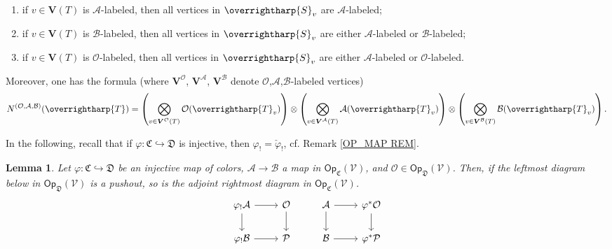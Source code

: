 \documentclass[a4paper,10pt
]{article}%
\numberwithin{equation}{section}
\numberwithin{figure}{section}
\newtheorem{lemma}[equation]{Lemma}%
\theoremstyle{definition} %
\newcommand{\vect}[1]{\text{\overrightharp{\ensuremath{#1}}}}
\newcommand{\V}{\ensuremath{\mathcal V}}
\newcommand{\1}{\ensuremath{\mathbbm 1}}%
\begin{document}
\begin{enumerate}[label=(\roman*)]
	\item if $v \in \boldsymbol{V}(T)$ is $\mathcal{A}$-labeled,
	then all vertices in $\vect{S}_{v}$ are $\mathcal{A}$-labeled;
	\item if $v \in \boldsymbol{V}(T)$ is $\mathcal{B}$-labeled,
	then all vertices in $\vect{S}_{v}$ are either $\mathcal{A}$-labeled or $\mathcal{B}$-labeled;
	\item if $v \in \boldsymbol{V}(T)$ is $\mathcal{O}$-labeled, then all vertices in $\vect{S}_{v}$ are either $\mathcal{A}$-labeled or $\mathcal{O}$-labeled.
\end{enumerate}
Moreover, one has the formula
(where $\boldsymbol{V}^{\mathcal{O}}$,
$\boldsymbol{V}^{\mathcal{A}}$,
$\boldsymbol{V}^{\mathcal{B}}$
denote
$\mathcal{O}$,$\mathcal{A}$,$\mathcal{B}$-labeled vertices)
\begin{equation}\label{NBAO EQ}
N^{(\mathcal{O},\mathcal{A},\mathcal{B})}(\vect{T}) = 
\left(\bigotimes_{v \in \boldsymbol{V}^{\mathcal{O}}(T)} \mathcal{O}(\vect{T}_v) \right)
\otimes
\left(\bigotimes_{v \in \boldsymbol{V}^{\mathcal{A}}(T)} \mathcal{A}(\vect{T}_v) \right)
\otimes
\left(\bigotimes_{v \in \boldsymbol{V}^{\mathcal{B}}(T)} \mathcal{B}(\vect{T}_v) \right).
\end{equation}


In the following, recall that if 
$\varphi \colon \mathfrak{C} \hookrightarrow \mathfrak{D}$
is injective, then
$\varphi_! = \check{\varphi}_!$,
cf. Remark \ref{OP_MAP REM}.



\begin{lemma}\label{BASICPUSH LEMMA}
	Let $\varphi \colon \mathfrak{C} \hookrightarrow \mathfrak{D}$ be an injective map of colors, 
	$\mathcal{A} \to \mathcal{B}$ a map in 
	$\mathsf{Op}_{\mathfrak{C}}(\V)$,
	and
	$\mathcal{O} \in \mathsf{Op}_{\mathfrak{D}}(\V)$.
	Then, if the leftmost diagram below in 
	$\mathsf{Op}_{\mathfrak{D}}(\V)$ is a pushout,
	so is the adjoint rightmost diagram in $\mathsf{Op}_{\mathfrak{C}}(\V)$.
	\[
	\begin{tikzcd}
	\varphi_! \mathcal{A} \ar{r} \ar{d} & \mathcal{O} \ar{d}
	&
	\mathcal{A} \ar{r} \ar{d} & \varphi^{\**} \mathcal{O} \ar{d}
	\\
	\varphi_! \mathcal{B} \ar{r} & \mathcal{P}
	&
	\mathcal{B} \ar{r} & \varphi^{\**} \mathcal{P}
	\end{tikzcd}
	\]
\end{lemma}
\end{document}
